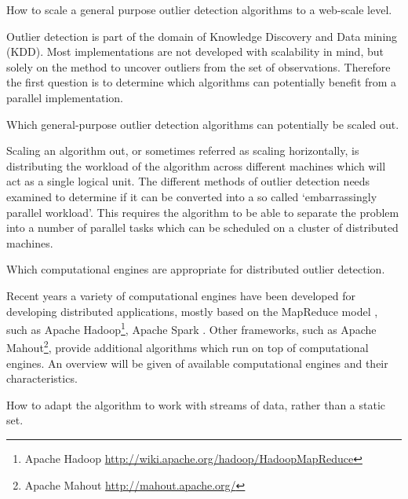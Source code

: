 \begin{research-question} 
How to scale a general purpose outlier detection algorithms to a web-scale level. \label{req1}
\end{research-question}   

Outlier detection is part of the domain of Knowledge Discovery and Data mining (KDD). Most implementations are not developed with scalability in mind, but solely on the method to uncover outliers from the set of observations. Therefore the first question is to determine which algorithms can potentially benefit from a parallel implementation.

\begin{research-sub-question} 
Which general-purpose outlier detection algorithms can potentially be scaled out. \label{sub-req1}
\end{research-sub-question}

Scaling an algorithm out, or sometimes referred as scaling horizontally, is distributing the workload of the algorithm across different machines which will act as a single logical unit. The different methods of outlier detection needs examined to determine if it can be converted into a so called `embarrassingly parallel workload'. This requires the algorithm to be able to separate the problem into a number of parallel tasks which can be scheduled on a cluster of distributed machines.

\begin{research-sub-question} 
Which computational engines are appropriate for distributed outlier detection. \label{sub-req2}
\end{research-sub-question}

Recent years a variety of computational engines have been developed for developing distributed applications, mostly based on the MapReduce model \cite{Dean:2008:MSD:1327452.1327492}, such as Apache Hadoop\footnote{Apache Hadoop \url{http://wiki.apache.org/hadoop/HadoopMapReduce}}, Apache Spark \cite{Zaharia:2010:SCC:1863103.1863113}. Other frameworks, such as Apache Mahout\footnote{Apache Mahout \url{http://mahout.apache.org/}}, provide additional algorithms which run on top of computational engines. An overview will be given of available computational engines and their characteristics.

\begin{research-sub-question} 
How to adapt the algorithm to work with streams of data, rather than a static set. \label{sub-req3}
\end{research-sub-question}

